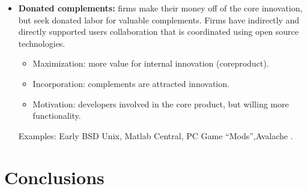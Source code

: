 \begin{itemize}
 \item \textbf{Donated complements:} firms make their money off of the core innovation, but seek donated labor for valuable complements. Firms have indirectly and directly supported users collaboration that is coordinated using open source technologies.

	\begin{itemize}
		\item Maximization: more value for internal innovation (coreproduct).
		\item Incorporation: complements are attracted innovation.
		\item Motivation: developers involved in the core product, but willing more functionality.
	\end{itemize}
Examples: Early BSD Unix, Matlab Central, PC Game “Mods”,Avalache .
\end{itemize}



\section{Conclusions}\label{conclusions}
